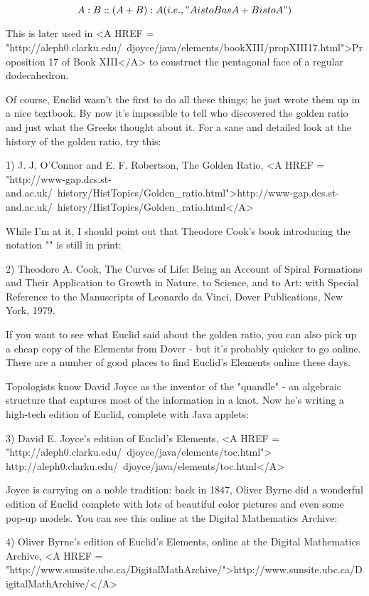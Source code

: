 $$
A:B::(A+B):A                (i.e., "A is to B as A+B is to A")
$$
    
This is later used in 
<A HREF = "http://aleph0.clarku.edu/~djoyce/java/elements/bookXIII/propXIII17.html">Proposition 17 of Book XIII</A> to construct
the pentagonal face of a regular dodecahedron.  

Of course, Euclid wasn't the first to do all these things; he just wrote
them up in a nice textbook.  By now it's impossible to tell who discovered
the golden ratio and just what the Greeks thought about it.  For a sane
and detailed look at the history of the golden ratio, try this:

1) J. J. O'Connor and E. F. Robertson, The Golden Ratio,
<A HREF = "http://www-gap.dcs.st-and.ac.uk/~history/HistTopics/Golden_ratio.html">http://www-gap.dcs.st-and.ac.uk/~history/HistTopics/Golden_ratio.html</A>

While I'm at it, I should point out that Theodore Cook's
book introducing the notation "\Phi " is still in print: 

2) Theodore A. Cook, The Curves of Life:
Being an Account of Spiral Formations and Their Application to Growth in 
Nature, to Science, and to Art: with Special Reference to the Manuscripts 
of Leonardo da Vinci, Dover Publications, New
York, 1979.

If you want to see what Euclid said about the golden ratio, you can
also pick up a cheap copy of the Elements from Dover - but it's probably 
quicker to go online.  There are a number of good places to find Euclid's 
Elements online these days.  

Topologists know David Joyce as the inventor of the "quandle" - an 
algebraic structure that captures most of the information in a knot. 
Now he's writing a high-tech edition of Euclid, complete with Java applets: 

3) David E. Joyce's edition of Euclid's Elements,
<A HREF = "http://aleph0.clarku.edu/~djoyce/java/elements/toc.html">
http://aleph0.clarku.edu/~djoyce/java/elements/toc.html</A>

Joyce is carrying on a noble tradition: back in 1847, Oliver Byrne did 
a wonderful edition of Euclid complete with lots of beautiful color 
pictures and even some pop-up models.  You can see this online at
the Digital Mathematics Archive:

4) Oliver Byrne's edition of Euclid's Elements, online at the Digital 
Mathematics Archive, <A HREF = "http://www.sunsite.ubc.ca/DigitalMathArchive/">http://www.sunsite.ubc.ca/DigitalMathArchive/</A>

